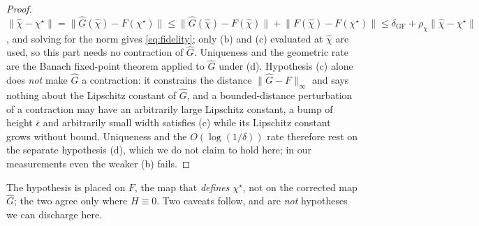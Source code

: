 \documentclass[journal,cmes,article,submit,moreauthors,pdftex]{Definitions/tsp}
\newcommand{\norm}[1]{\lVert #1 \rVert}
\begin{document}
\begin{proof}
$\norm{\hat\chi-\chi^{\star}}=\norm{\hat G(\hat\chi)-F(\chi^{\star})}
\le\norm{\hat G(\hat\chi)-F(\hat\chi)}+\norm{F(\hat\chi)-F(\chi^{\star})}
\le\delta_{\mathrm{GF}}+\rho_\chi\norm{\hat\chi-\chi^{\star}}$, and solving for the norm gives
\eqref{eq:fidelity}; only (b) and (c) evaluated at $\hat\chi$ are used, so this part needs no
contraction of $\hat G$. Uniqueness and the geometric rate are the Banach fixed-point theorem
applied to $\hat G$ under (d). Hypothesis (c) alone does \emph{not} make $\hat G$ a contraction: it
constrains the distance $\norm{\hat G-F}_\infty$ and says nothing about the Lipschitz constant of
$\hat G$, and a bounded-distance perturbation of a contraction may have an arbitrarily large
Lipschitz constant, a bump of height $\bar\epsilon$ and arbitrarily small width satisfies (c)
while its Lipschitz constant grows without bound. Uniqueness and the $O(\log(1/\delta))$ rate
therefore rest on the separate hypothesis (d), which we do not claim to hold here; in our
measurements even the weaker (b) fails.
\end{proof}
The hypothesis is placed on $F$, the map that \emph{defines} $\chi^{\star}$, not on the corrected
map $\hat G$; the two agree only where $H\equiv0$. Two caveats follow, and are \emph{not}
hypotheses we can discharge here.
\end{document}
